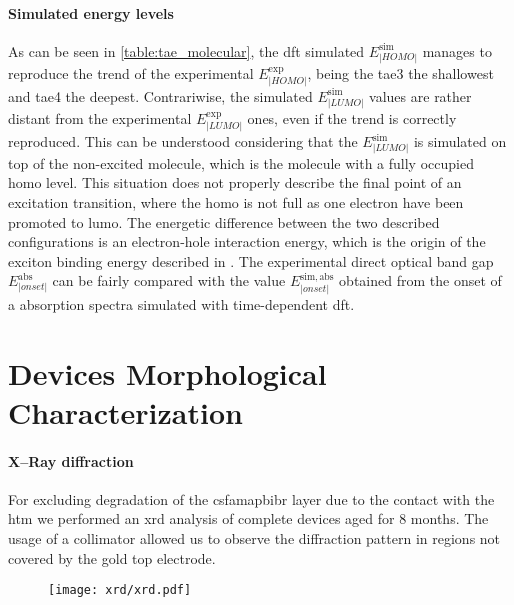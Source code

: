 \paragraph{Simulated energy levels}
As can be seen in \cref{table:tae_molecular}, the \gls{dft} simulated $E^{\mathrm{sim}}_|HOMO|$ manages to reproduce the trend of the experimental $E^{\mathrm{exp}}_|HOMO|$, being the \gls{tae3} the shallowest and \gls{tae4} the deepest.
Contrariwise, the simulated $E^{\mathrm{sim}}_|LUMO|$ values are rather distant from the experimental $E^{\mathrm{exp}}_|LUMO|$ ones, even if the trend is correctly reproduced.
This can be understood considering that the $E^{\mathrm{sim}}_|LUMO|$ is simulated on top of the non\hyp{}excited molecule, which is the molecule with a fully occupied \gls{homo} level.
This situation does not properly describe the final point of an excitation transition, where the \gls{homo} is not full as one electron have been promoted to \gls{lumo}.
The energetic difference between the two described configurations is an electron\hyp{}hole interaction energy, which is the origin of the exciton binding energy described in .
The experimental direct optical band gap \small$E^{\mathrm{abs}}_|onset|$ can be fairly compared with the value $E^{\mathrm{sim,abs}}_|onset|$ obtained from the onset of a absorption spectra simulated with time\hyp{}dependent \gls{dft}.



\section{Devices Morphological Characterization}

\paragraph{X--Ray diffraction}

For excluding degradation of the \gls{csfamapbibr} layer due to the contact with the \gls{htm} we performed an \gls{xrd} analysis of complete devices aged for 8 months.
The usage of a collimator allowed us to observe the diffraction pattern in regions not covered by the gold top electrode.


\begin{figure}
			\centering
				\texttt{[image: xrd/xrd.pdf]}
			\label{fig:tae_xrd}
\end{figure}


